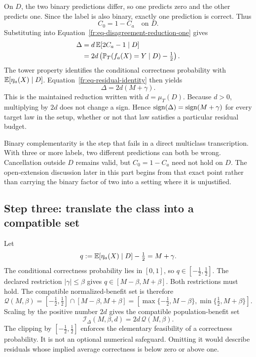 On $D$, the two binary predictions differ, so one predicts zero and the other predicts one.  Since
the label is also binary, exactly one prediction is correct.  Thus
\begin{equation}
  C_0=1-C_a \quad\text{on }D.
  \label{fr:eq-binary-complement}
\end{equation}
Substituting into Equation~\eqref{fr:eq-disagreement-reduction-one} gives
\begin{align}
  \Delta
    &=d\,\mathbb{E}[2C_a-1\mid D] \\
    &=2d\left(\mathbb{P}_T(f_a(X)=Y\mid D)-\tfrac12\right).
  \label{fr:eq-benefit-from-correctness}
\end{align}
The tower property identifies the conditional correctness probability with
$\mathbb{E}[\eta_a(X)\mid D]$.  Equation~\eqref{fr:eq-residual-identity} then yields
\begin{equation}
  \boxed{\Delta=2d(M+\gamma).}
  \label{fr:eq-benefit-factorization}
\end{equation}
This is the maintained reduction written with $d=\mu_T(D)$.  Because $d>0$, multiplying by $2d$
does not change a sign.  Hence $\operatorname{sign}(\Delta)=\operatorname{sign}(M+\gamma)$ for every target law in the setup,
whether or not that law satisfies a particular residual budget.

Binary complementarity is the step that fails in a direct multiclass transcription.  With three or
more labels, two different predictions can both be wrong.  Cancellation outside $D$ remains valid,
but $C_0=1-C_a$ need not hold on $D$.  The open-extension discussion later in this part begins from
that exact point rather than carrying the binary factor of two into a setting where it is unjustified.

\subsection{Step three: translate the class into a compatible set}
\label{fr:subsec-compatible-set}

Let
\begin{equation}
  q:=\mathbb{E}[\eta_a(X)\mid D]-\tfrac12=M+\gamma.
  \label{fr:eq-normalized-benefit}
\end{equation}
The conditional correctness probability lies in $[0,1]$, so $q\in[-\tfrac12,\tfrac12]$.
The declared restriction $|\gamma|\le\beta$ gives
$q\in[M-\beta,M+\beta]$.  Both restrictions must hold.  The compatible normalized-benefit set is
therefore
\begin{equation}
  \mathcal Q(M,\beta)
  =[-\tfrac12,\tfrac12]\cap[M-\beta,M+\beta]
  =\left[\max\{-\tfrac12,M-\beta\},
          \min\{\tfrac12,M+\beta\}\right].
  \label{fr:eq-compatible-q}
\end{equation}
Scaling by the positive number $2d$ gives the compatible population-benefit set
\begin{equation}
  \mathcal I_\Delta(M,\beta,d)
  =2d\,\mathcal Q(M,\beta).
  \label{fr:eq-compatible-benefit}
\end{equation}
The clipping by $[-\tfrac12,\tfrac12]$ enforces the elementary feasibility of a correctness
probability.  It is not an optional numerical safeguard.  Omitting it would describe residuals
whose implied average correctness is below zero or above one.

